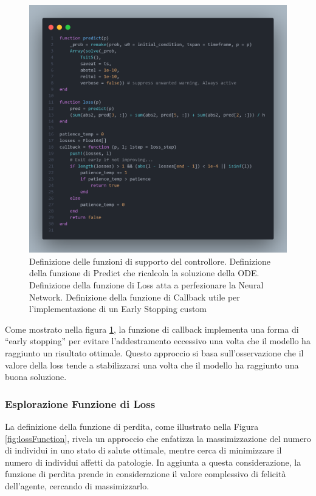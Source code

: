 \begin{figure}[H]
    \begin{center}
		\includegraphics[width=\textwidth]{img/controller2.png}
		\caption{Definizione delle funzioni di supporto del controllore. Definizione della funzione di Predict che ricalcola la soluzione della ODE. Definizione della funzione di Loss atta a perfezionare la Neural Network. Definizione della funzione di Callback utile per l'implementazione di un Early Stopping custom}
		\label{fig:controller2}
	\end{center}
\end{figure}

Come mostrato nella figura \ref{fig:controller2}, la funzione di 
callback implementa una forma di ``early stopping'' per evitare 
l'addestramento eccessivo una volta che il modello ha raggiunto un 
risultato ottimale. Questo approccio si basa sull'osservazione che 
il valore della loss tende a stabilizzarsi una volta che il modello 
ha raggiunto una buona soluzione.

\newpage

\subsubsection{Esplorazione Funzione di Loss}

La definizione della funzione di perdita, come illustrato nella Figura 
\ref{fig:lossFunction}, rivela un approccio che enfatizza la 
massimizzazione del numero di individui in uno stato di salute ottimale, 
mentre cerca di minimizzare il numero di individui affetti da patologie. 
In aggiunta a questa considerazione, la funzione di perdita prende in 
considerazione il valore complessivo di felicità dell'agente, cercando di 
massimizzarlo. 

